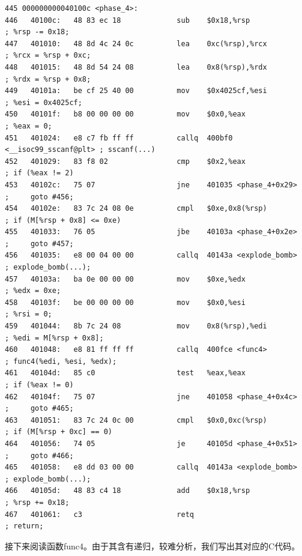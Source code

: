 \documentclass{article}
\begin{document}
\begin{lstlisting}[title = phase\_4反汇编代码及注释, xleftmargin = 2em,xrightmargin = 2em, aboveskip = 1em, numbers = none, basicstyle=\footnotesize\ttfamily]
445 000000000040100c <phase_4>:
446   40100c:   48 83 ec 18             sub    $0x18,%rsp                   ; %rsp -= 0x18;
447   401010:   48 8d 4c 24 0c          lea    0xc(%rsp),%rcx               ; %rcx = %rsp + 0xc;
448   401015:   48 8d 54 24 08          lea    0x8(%rsp),%rdx               ; %rdx = %rsp + 0x8;
449   40101a:   be cf 25 40 00          mov    $0x4025cf,%esi               ; %esi = 0x4025cf;
450   40101f:   b8 00 00 00 00          mov    $0x0,%eax                    ; %eax = 0;
451   401024:   e8 c7 fb ff ff          callq  400bf0 <__isoc99_sscanf@plt> ; sscanf(...)
452   401029:   83 f8 02                cmp    $0x2,%eax                    ; if (%eax != 2)
453   40102c:   75 07                   jne    401035 <phase_4+0x29>        ;     goto #456;
454   40102e:   83 7c 24 08 0e          cmpl   $0xe,0x8(%rsp)               ; if (M[%rsp + 0x8] <= 0xe)
455   401033:   76 05                   jbe    40103a <phase_4+0x2e>        ;     goto #457;
456   401035:   e8 00 04 00 00          callq  40143a <explode_bomb>        ; explode_bomb(...);
457   40103a:   ba 0e 00 00 00          mov    $0xe,%edx                    ; %edx = 0xe;
458   40103f:   be 00 00 00 00          mov    $0x0,%esi                    ; %rsi = 0;
459   401044:   8b 7c 24 08             mov    0x8(%rsp),%edi               ; %edi = M[%rsp + 0x8];
460   401048:   e8 81 ff ff ff          callq  400fce <func4>               ; func4(%edi, %esi, %edx);
461   40104d:   85 c0                   test   %eax,%eax                    ; if (%eax != 0)
462   40104f:   75 07                   jne    401058 <phase_4+0x4c>        ;     goto #465;
463   401051:   83 7c 24 0c 00          cmpl   $0x0,0xc(%rsp)               ; if (M[%rsp + 0xc] == 0)
464   401056:   74 05                   je     40105d <phase_4+0x51>        ;     goto #466;
465   401058:   e8 dd 03 00 00          callq  40143a <explode_bomb>        ; explode_bomb(...);
466   40105d:   48 83 c4 18             add    $0x18,%rsp                   ; %rsp += 0x18;
467   401061:   c3                      retq                                ; return;
\end{lstlisting}

接下来阅读函数func4。由于其含有递归，较难分析，我们写出其对应的C代码。
\end{document}
